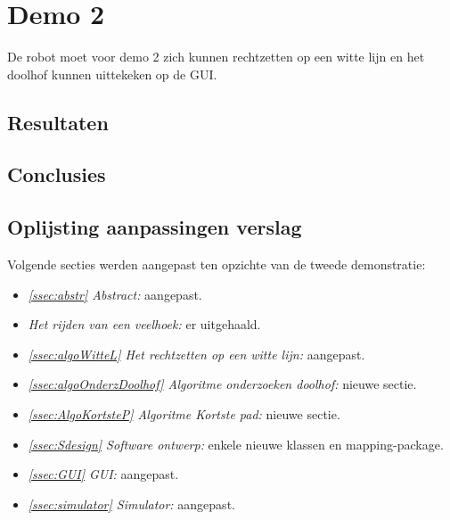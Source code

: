 \documentclass[tt3]{penoverslag}
\begin{document}
\section{Demo 2} %
\label{Asec:demo2}
De robot moet voor demo 2 zich kunnen rechtzetten op een witte lijn en het doolhof kunnen uittekeken op de GUI.

\subsection{Resultaten} %
\label{Assec:result2}



\subsection{Conclusies} %
\label{Assec:conc2}


\subsection{Oplijsting aanpassingen verslag} %
\label{Assec:aanp2}
Volgende secties werden aangepast ten opzichte van de tweede demonstratie:

\begin{itemize}

\item \textit{\ref{ssec:abstr} Abstract:} aangepast.
\item \textit{ Het rijden van een veelhoek:} er uitgehaald.
\item \textit{\ref{ssec:algoWitteL} Het rechtzetten op een witte lijn:} aangepast.
\item \textit{\ref{ssec:algoOnderzDoolhof} Algoritme onderzoeken doolhof:} nieuwe sectie.
\item \textit{\ref{ssec:AlgoKortsteP} Algoritme Kortste pad:} nieuwe sectie.
\item \textit{\ref{ssec:Sdesign} Software ontwerp:} enkele nieuwe klassen en mapping-package.
\item \textit{\ref{ssec:GUI} GUI:} aangepast.
\item \textit{\ref{ssec:simulator} Simulator:} aangepast.
\end{itemize}

\end{document}
